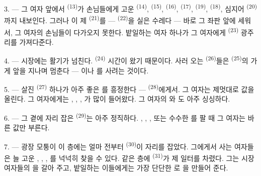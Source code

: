 3. --- 그 여자 앞에서  \textsuperscript{(13)}가 손님들에게 고운
 \textsuperscript{(14)},  \textsuperscript{(15)},
 \textsuperscript{(16)},  \textsuperscript{(17)},
 \textsuperscript{(19)},  \textsuperscript{(18)}, 심지어
 \textsuperscript{(20)}까지 내보인다. 그러나 이 제
 \textsuperscript{(21)}를 —  \textsuperscript{(22)}을 실은
수레다 — 바로 그 좌판 앞에 세워서, 그 여자의 손님들이 다가오지 못한다. 밭일하는 여자
하나가 그 여자에게  \textsuperscript{(23)} 광주리를 가져다준다.

\VUsaut{4.0mm}
\VUsaut{3.0mm}

4. --- 시장에는 활기가 넘친다.  \textsuperscript{(24)} 시간이 왔기 때문이다.
사러 오는  \textsuperscript{(26)}들은 
\textsuperscript{(25)}의 가게 앞을 지나며 멈춘다 — 이나 를
사려는 것이다.

5. --- 살진  \textsuperscript{(27)} 하나가 아주 좋은 를
흥정한다 —  \textsuperscript{(28)}에게서. 그 여자는 제멋대로 값을
올린다. 그 여자에게는 , , , 가
많이 들어왔다. 그 여자의 와 도 아주 싱싱하다.

\VUsaut{4.0mm}
\VUsaut{3.0mm}

6. --- 그 곁에 자리 잡은  \textsuperscript{(29)}는 아주 정직하다.
, , , 또는 수수한 를 팔 때 그
여자는 바른 값만 부른다.

7. --- 광장 모퉁이 이 층에는 얼마 전부터  \textsuperscript{(30)}이
자리를 잡았다. 그에게서 사는 여자들은 늘 고운 , ,
, 를 넉넉히 찾을 수 있다. 같은 층에 
\textsuperscript{(31)}가 제 일터를 차렸다. 그는 시장 여자들의 을 갈아 주고,
밭일하는 이들에게는 가장 단단한 로 을 만들어 준다.

\VUsaut{4.0mm}
\VUsaut{3.0mm}

